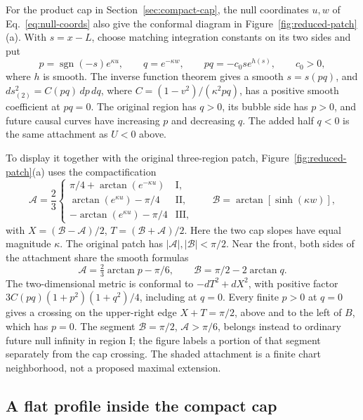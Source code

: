 \documentclass[10pt]{article}
\begin{document}
For the product cap in Section~\ref{sec:compact-cap}, the null coordinates
\(u,w\) of Eq.~\eqref{eq:null-coords} also give the conformal diagram in
Figure~\ref{fig:reduced-patch}(a).  With \(s=x-L\), choose matching integration
constants on its two sides and put
\begin{equation}
  p=\operatorname{sgn}(-s)e^{\kappa u},\qquad
  q=e^{-\kappa w},\qquad
  pq=-c_0s e^{h(s)},\qquad c_0>0,
  \label{eq:cap-conformal-coordinates}
\end{equation}
where \(h\) is smooth.  The inverse function theorem gives a smooth
\(s=s(pq)\), and
\(ds^2_{(2)}=C(pq)\,dp\,dq\), where
\(C=(1-v^2)/(\kappa^2pq)\), has a positive smooth coefficient at
\(pq=0\).  The original region has \(q>0\), its bubble side has \(p>0\),
and future causal curves have increasing \(p\) and decreasing \(q\).
The added half \(q<0\) is the same attachment as \(U<0\) above.

To display it together with the original three-region patch,
Figure~\ref{fig:reduced-patch}(a) uses the compactification
\begin{equation}
  \mathcal A=\frac23
  \begin{cases}
    \pi/4+\arctan(e^{-\kappa u}) & \text{I},\\
    \arctan(e^{\kappa u})-\pi/4 & \text{II},\\
    -\arctan(e^{\kappa u})-\pi/4 & \text{III},
  \end{cases}
  \qquad \mathcal B=\arctan[\sinh(\kappa w)],
  \label{eq:cap-global-compactification}
\end{equation}
with \(X=(\mathcal B-\mathcal A)/2\), \(T=(\mathcal B+\mathcal A)/2\).
Here the two cap slopes have equal magnitude \(\kappa\).
The original patch has \(|\mathcal A|,|\mathcal B|<\pi/2\).
Near the front, both sides of the attachment share the smooth formulas
\[
  \mathcal A=\tfrac23\arctan p-\pi/6,\qquad
  \mathcal B=\pi/2-2\arctan q.
\]
The two-dimensional metric is conformal to \(-dT^2+dX^2\), with positive
factor \(3C(pq)(1+p^2)(1+q^2)/4\), including at \(q=0\).
Every finite \(p>0\) at \(q=0\) gives a crossing on the upper-right edge
\(X+T=\pi/2\), above and to the left of \(B\), which has \(p=0\).
The segment \(\mathcal B=\pi/2\), \(\mathcal A>\pi/6\), belongs instead
to ordinary future null infinity in region I; the figure labels a portion
of that segment separately from the cap crossing.  The shaded attachment
is a finite chart neighborhood, not a proposed maximal extension.

\subsection{A flat profile inside the compact cap}
\label{sec:flat-crossing}
\end{document}

